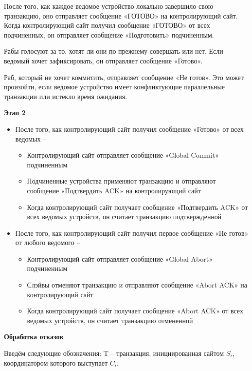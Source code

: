 После того, как каждое ведомое устройство локально завершило свою транзакцию, оно отправляет
сообщение «ГОТОВО» на контролирующий сайт. Когда контролирующий сайт получил сообщение «ГОТОВО» от всех подчиненных,
он отправляет сообщение «Подготовить» подчиненным.

Рабы голосуют за то, хотят ли они по-прежнему совершать или нет. Если ведомый хочет зафиксировать,
он отправляет сообщение «Готово».

Раб, который не хочет коммитить, отправляет сообщение «Не готов». Это может произойти, если ведомое
устройство имеет конфликтующие параллельные транзакции или истекло время ожидания.

\textbf{Этап 2}

\begin{itemize}
    \item После того, как контролирующий сайт получил сообщение «Готово» от всех ведомых \autocite{FixProtocols} –
    \begin{itemize}
        \item Контролирующий сайт отправляет сообщение «Global Commit» подчиненным
        \item Подчиненные устройства применяют транзакцию и отправляют сообщение «Подтвердить ACK» на контролирующий сайт
        \item Когда контролирующий сайт получает сообщение «Подтвердить ACK» от всех ведомых
        устройств, он считает транзакцию подтвержденной
    \end{itemize}
    \item После того, как контролирующий сайт получил первое сообщение «Не готов» от любого ведомого –
    \begin{itemize}
        \item Контролирующий сайт отправляет сообщение «Global Abort» подчиненным
        \item Слэйвы отменяют транзакцию и отправляют сообщение «Abort ACK» на контролирующий сайт
        \item Когда контролирующий сайт получает сообщение «Abort ACK» от всех ведомых
        устройств, он считает транзакцию отмененной
    \end{itemize}

\end{itemize}
\textbf{Обработка отказов}

Введём следующие обозначения: T -- транзакция, инициированная сайтом $S_i$, координатором которого выступает $C_i$.

